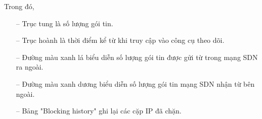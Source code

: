 Trong đó,

\begin{itemize}
	\item [--] Trục tung là số lượng gói tin.
	\item [--] Trục hoành là thời điểm kể từ khi truy cập vào công cụ theo dõi.
	\item [--] Đường màu xanh lá biểu diễn số lượng gói tin được gửi từ trong mạng SDN ra ngoài.
	\item [--] Đường màu xanh dương biểu diễn số lượng gói tin mạng SDN nhận từ bên ngoài.
	\item [--] Bảng "Blocking history" ghi lại các cặp IP đã chặn.
\end{itemize}